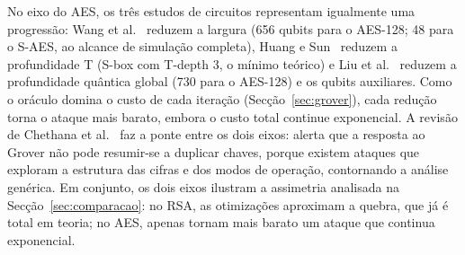 \documentclass[11pt,a4paper]{article}
\begin{document}
No eixo do AES, os três estudos de circuitos representam igualmente uma progressão: Wang et al.~\cite{wang2022} reduzem a largura (656 qubits para o AES-128; 48 para o S-AES, ao alcance de simulação completa), Huang e Sun~\cite{huang2022} reduzem a profundidade T (S-box com T-depth 3, o mínimo teórico) e Liu et al.~\cite{liu2023} reduzem a profundidade quântica global (730 para o AES-128) e os qubits auxiliares. Como o oráculo domina o custo de cada iteração (Secção~\ref{sec:grover}), cada redução torna o ataque mais barato, embora o custo total continue exponencial. A revisão de Chethana et al.~\cite{chethana2025} faz a ponte entre os dois eixos: alerta que a resposta ao Grover não pode resumir-se a duplicar chaves, porque existem ataques que exploram a estrutura das cifras e dos modos de operação, contornando a análise genérica. Em conjunto, os dois eixos ilustram a assimetria analisada na Secção~\ref{sec:comparacao}: no RSA, as otimizações aproximam a quebra, que já é total em teoria; no AES, apenas tornam mais barato um ataque que continua exponencial.
\end{document}
